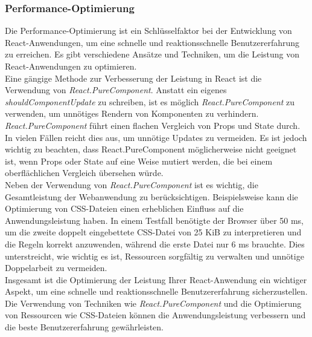 \subsubsection{Performance-Optimierung}
Die Performance-Optimierung ist ein Schlüsselfaktor bei der Entwicklung von React-Anwendungen, um eine schnelle und reaktionsschnelle Benutzererfahrung zu erreichen. Es gibt verschiedene Ansätze und Techniken, um die Leistung von React-Anwendungen zu optimieren.\\
Eine gängige Methode zur Verbesserung der Leistung in React ist die Verwendung von \emph{React.PureComponent}. Anstatt ein eigenes \emph{shouldComponentUpdate} zu schreiben, ist es möglich \emph{React.PureComponent} zu verwenden, um unnötiges Rendern von Komponenten zu verhindern. \emph{React.PureComponent} führt einen flachen Vergleich von Props und State durch. In vielen Fällen reicht dies aus, um unnötige Updates zu vermeiden.
Es ist jedoch wichtig zu beachten, dass React.PureComponent möglicherweise nicht geeignet ist, wenn Props oder State auf eine Weise mutiert werden, die bei einem oberflächlichen Vergleich übersehen würde.\\
Neben der Verwendung von \emph{React.PureComponent} ist es wichtig, die Gesamtleistung der Webanwendung zu berücksichtigen. Beispielsweise kann die Optimierung von CSS-Dateien einen erheblichen Einfluss auf die Anwendungsleistung haben. In einem Testfall benötigte der Browser über 50 ms, um die zweite doppelt eingebettete CSS-Datei von 25 KiB zu interpretieren und die Regeln korrekt anzuwenden, während die erste Datei nur 6 ms brauchte. Dies unterstreicht, wie wichtig es ist, Ressourcen sorgfältig zu verwalten und unnötige Doppelarbeit zu vermeiden.\cite{react-performance}\\

Insgesamt ist die Optimierung der Leistung Ihrer React-Anwendung ein wichtiger Aspekt, um eine schnelle und reaktionsschnelle Benutzererfahrung sicherzustellen. Die Verwendung von Techniken wie \emph{React.PureComponent} und die Optimierung von Ressourcen wie CSS-Dateien können die Anwendungsleistung verbessern und die beste Benutzererfahrung gewährleisten.\cite{css-performance}\\


